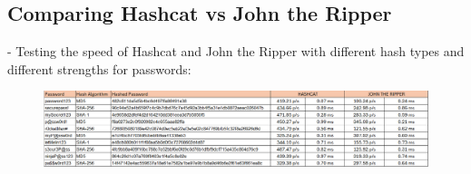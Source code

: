 \documentclass[10pt,oneside,english,a4paper]{article}
\begin{document}
\subsection{Comparing Hashcat vs John the Ripper}
- Testing the speed of Hashcat and John the Ripper with different hash types and different strengths for passwords:
\begin{figure}[h]
	\centering
    \includegraphics[width=1.3\textwidth, height=1.1\textheight, keepaspectratio]{compare_table_hashcat_jtr.png}
\end{figure}
\end{document}
